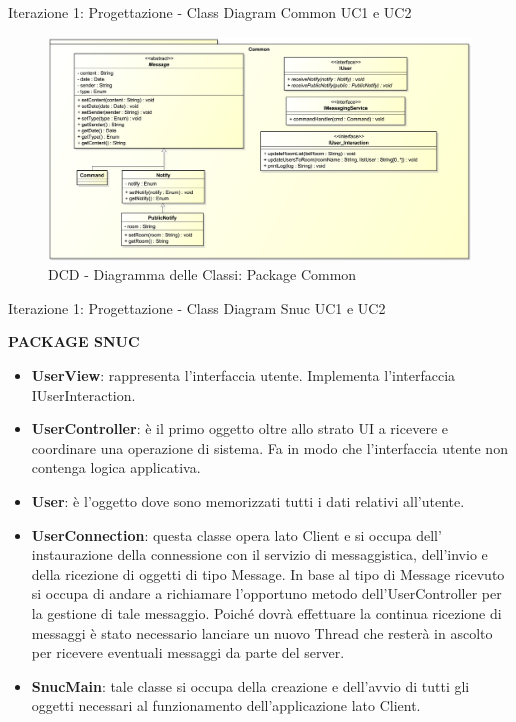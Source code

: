 \begin{frame} {Iterazione 1: Progettazione - Class Diagram Common UC1 e UC2}
   \begin{figure}
     \includegraphics[scale=0.165]{image_astah/Iteration_1_DesignModel/ClassDiagramCommon.png}{\centering}
     \caption{DCD - Diagramma delle Classi: Package Common }
     \label{fig_UC1_UC2_DCD_1} 
   \end{figure}
\end{frame}

\begin{frame} [allowframebreaks] {Iterazione 1: Progettazione - Class Diagram Snuc UC1 e UC2}
  \centerline{\textbf{PACKAGE SNUC}}
  \begin{itemize}
   \item \textbf{UserView}: rappresenta l'interfaccia utente. Implementa l'interfaccia IUserInteraction.
   \item \textbf{UserController}: è il primo oggetto oltre allo strato UI a ricevere e coordinare una operazione di sistema. Fa in modo che l'interfaccia utente non 
         contenga logica applicativa.
   \item \textbf{User}: è l'oggetto dove sono memorizzati tutti i dati relativi all'utente.
   \item \textbf{UserConnection}: questa classe opera lato Client e si occupa dell' instaurazione della connessione con il servizio di messaggistica, dell'invio e 
         della ricezione di oggetti di tipo Message. In base al tipo di Message ricevuto si occupa di andare a richiamare l'opportuno metodo dell'UserController per 
         la gestione di tale messaggio. Poiché dovrà effettuare la continua ricezione di messaggi è stato necessario lanciare un nuovo Thread che resterà in ascolto 
         per ricevere eventuali messaggi da parte del server.
   \item \textbf{SnucMain}: tale classe si occupa della creazione e dell'avvio di tutti gli oggetti necessari al funzionamento dell'applicazione lato Client.
  \end{itemize} 
 \end{frame}

